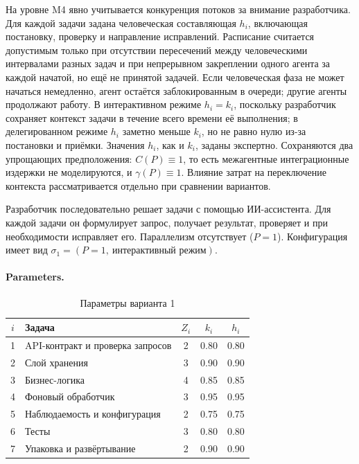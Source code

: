 \documentclass[12pt,a4paper]{article}
\theoremstyle{definition}
\begin{document}
На уровне M4 явно учитывается конкуренция потоков за внимание разработчика. Для каждой задачи задана человеческая составляющая $h_i$, включающая постановку, проверку и направление исправлений. Расписание считается допустимым только при отсутствии пересечений между человеческими интервалами разных задач и при непрерывном закреплении одного агента за каждой начатой, но ещё не принятой задачей. Если человеческая фаза не может начаться немедленно, агент остаётся заблокированным в очереди; другие агенты продолжают работу. В интерактивном режиме $h_i = k_i$, поскольку разработчик сохраняет контекст задачи в течение всего времени её выполнения; в делегированном режиме $h_i$ заметно меньше $k_i$, но не равно нулю из-за постановки и приёмки. Значения $h_i$, как и $k_i$, заданы экспертно. Сохраняются два упрощающих предположения: $C(P) \equiv 1$, то есть межагентные интеграционные издержки не моделируются, и $\gamma(P) \equiv 1$. Влияние затрат на переключение контекста рассматривается отдельно при сравнении вариантов.


Разработчик последовательно решает задачи с помощью ИИ-ассистента. Для каждой задачи он формулирует запрос, получает результат, проверяет и при необходимости исправляет его. Параллелизм отсутствует ($P = 1$). Конфигурация имеет вид $\sigma_1 = (P{=}1,\ \text{интерактивный режим})$.

\paragraph{Parameters.}
\begin{table}[ht!]
\centering
\caption{Параметры варианта 1}
\label{tab:practical-v1-params}
\begin{tabular}{clccc}
\toprule
$i$ & Задача & $Z_i$ & $k_i$ & $h_i$ \\
\midrule
1 & API-контракт и проверка запросов & 2 & 0.80 & 0.80 \\
2 & Слой хранения & 3 & 0.90 & 0.90 \\
3 & Бизнес-логика & 4 & 0.85 & 0.85 \\
4 & Фоновый обработчик & 3 & 0.95 & 0.95 \\
5 & Наблюдаемость и конфигурация & 2 & 0.75 & 0.75 \\
6 & Тесты & 3 & 0.80 & 0.80 \\
7 & Упаковка и развёртывание & 2 & 0.90 & 0.90 \\
\bottomrule
\end{tabular}
\end{table}
\end{document}
